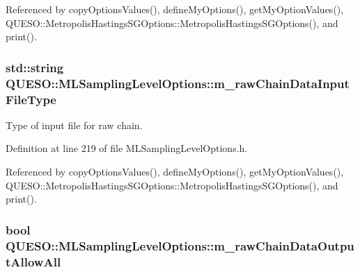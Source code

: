 Referenced by copy\-Options\-Values(), define\-My\-Options(), get\-My\-Option\-Values(), Q\-U\-E\-S\-O\-::\-Metropolis\-Hastings\-S\-G\-Options\-::\-Metropolis\-Hastings\-S\-G\-Options(), and print().

\hypertarget{class_q_u_e_s_o_1_1_m_l_sampling_level_options_af216317de1aba551bfddd2be38e26898}{
\subsubsection[{m\-\_\-raw\-Chain\-Data\-Input\-File\-Type}]{\setlength{\rightskip}{0pt plus 5cm}std\-::string Q\-U\-E\-S\-O\-::\-M\-L\-Sampling\-Level\-Options\-::m\-\_\-raw\-Chain\-Data\-Input\-File\-Type}}\label{class_q_u_e_s_o_1_1_m_l_sampling_level_options_af216317de1aba551bfddd2be38e26898}


Type of input file for raw chain. 



Definition at line 219 of file M\-L\-Sampling\-Level\-Options.\-h.



Referenced by copy\-Options\-Values(), define\-My\-Options(), get\-My\-Option\-Values(), Q\-U\-E\-S\-O\-::\-Metropolis\-Hastings\-S\-G\-Options\-::\-Metropolis\-Hastings\-S\-G\-Options(), and print().

\hypertarget{class_q_u_e_s_o_1_1_m_l_sampling_level_options_a4e84fdd26bf87099d2b126f5fda379a6}{
\subsubsection[{m\-\_\-raw\-Chain\-Data\-Output\-Allow\-All}]{\setlength{\rightskip}{0pt plus 5cm}bool Q\-U\-E\-S\-O\-::\-M\-L\-Sampling\-Level\-Options\-::m\-\_\-raw\-Chain\-Data\-Output\-Allow\-All}}\label{class_q_u_e_s_o_1_1_m_l_sampling_level_options_a4e84fdd26bf87099d2b126f5fda379a6}


